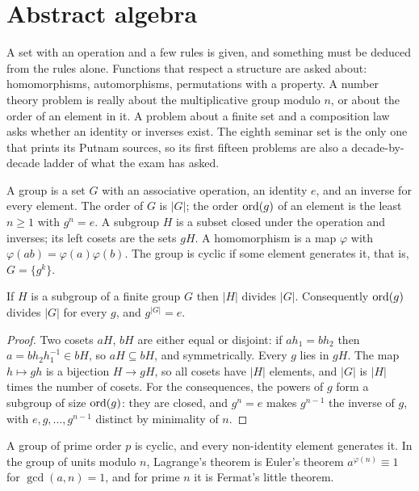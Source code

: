 \section{Abstract algebra}

\begin{recognise}
A set with an operation and a few rules is given, and something must be deduced from the rules alone. Functions that respect a structure are asked about: homomorphisms, automorphisms, permutations with a property. A number theory problem is really about the multiplicative group modulo $n$, or about the order of an element in it. A problem about a finite set and a composition law asks whether an identity or inverses exist. The eighth seminar set is the only one that prints its Putnam sources, so its first fifteen problems are also a decade-by-decade ladder of what the exam has asked.
\end{recognise}

\begin{definition}
A group is a set $G$ with an associative operation, an identity $e$, and an inverse for every element. The order of $G$ is $|G|$; the order $\operatorname{ord}(g)$ of an element is the least $n\ge1$ with $g^n=e$. A subgroup $H$ is a subset closed under the operation and inverses; its left cosets are the sets $gH$. A homomorphism is a map $\varphi$ with $\varphi(ab)=\varphi(a)\varphi(b)$. The group is cyclic if some element generates it, that is, $G=\{g^k\}$.
\end{definition}

\begin{theorem}[Lagrange]
If $H$ is a subgroup of a finite group $G$ then $|H|$ divides $|G|$. Consequently $\operatorname{ord}(g)$ divides $|G|$ for every $g$, and $g^{|G|}=e$.
\end{theorem}

\begin{proof}
Two cosets $aH$, $bH$ are either equal or disjoint: if $ah_1=bh_2$ then $a=bh_2h_1^{-1}\in bH$, so $aH\subseteq bH$, and symmetrically. Every $g$ lies in $gH$. The map $h\mapsto gh$ is a bijection $H\to gH$, so all cosets have $|H|$ elements, and $|G|$ is $|H|$ times the number of cosets. For the consequences, the powers of $g$ form a subgroup of size $\operatorname{ord}(g)$: they are closed, and $g^n=e$ makes $g^{n-1}$ the inverse of $g$, with $e,g,\dots,g^{n-1}$ distinct by minimality of $n$.
\end{proof}

\begin{proposition}
A group of prime order $p$ is cyclic, and every non-identity element generates it. In the group of units modulo $n$, Lagrange's theorem is Euler's theorem $a^{\varphi(n)}\equiv1$ for $\gcd(a,n)=1$, and for prime $n$ it is Fermat's little theorem.
\end{proposition}

